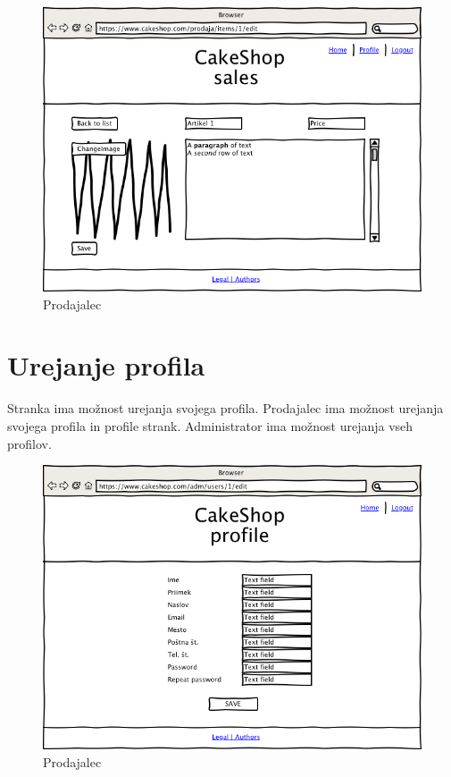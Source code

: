 \documentclass[a4paper,12pt]{report}
\begin{document}
\begin{figure}[htb]
	\centering
	\includegraphics[width=13cm]{Wireframes/cakeshop/pngs/030101-ItemsDetailsSalesman.png}
	\caption{Prodajalec}
\label{fig:5}
\end{figure}

\section{Urejanje profila}

Stranka ima možnost urejanja svojega profila. Prodajalec ima možnost urejanja svojega profila in profile strank. Administrator ima možnost urejanja vseh profilov.

\begin{figure}[htb]
	\centering
	\includegraphics[width=13cm]{Wireframes/cakeshop/pngs/040201-ProfileClientsAdmin.png}
	\caption{Prodajalec}
\label{fig:5}
\end{figure}
\end{document}
